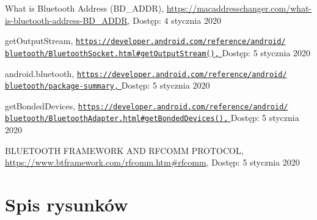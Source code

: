 \documentclass[a4paper,12pt, twoside]{article}
\begin{document}
\begin{thebibliography}{}
    		What is Bluetooth Address (BD\_ADDR),
    		\newline\url{https://macaddresschanger.com/what-is-bluetooth-address-BD_ADDR}, 
    		\newline Dostęp: 4 stycznia 2020
    		
    		getOutputStream,
    		\newline\href{https://developer.android.com/reference/android/bluetooth/BluetoothSocket.html\#getOutputStream()}
    		 {\nolinkurl{https://developer.android.com/reference/android/}
                 \\
                  \nolinkurl{bluetooth/BluetoothSocket.html\#getOutputStream(),}
                 }
    		\newline Dostęp: 5 stycznia 2020
    		
    		android.bluetooth,
    		\newline\href{https://developer.android.com/reference/android/bluetooth/}
    		 {\nolinkurl{https://developer.android.com/reference/android/}
                 \\
                  \nolinkurl{bluetooth/package-summary,}
                 }
    		\newline Dostęp: 5 stycznia 2020
    		
    		getBondedDevices,
    		\newline\href{https://developer.android.com/reference/android/bluetooth/BluetoothAdapter.html\#getBondedDevices()}
    		 {\nolinkurl{https://developer.android.com/reference/android/}
                 \\
                  \nolinkurl{bluetooth/BluetoothAdapter.html\#getBondedDevices(),}
                 }
    		\newline Dostęp: 5 stycznia 2020
    		
    		BLUETOOTH FRAMEWORK AND RFCOMM PROTOCOL,
    		\newline\url{https://www.btframework.com/rfcomm.htm#rfcomm}, 
    		\newline Dostęp: 5 stycznia 2020
    		
    	\end{thebibliography}
    	\endgroup
    	
    	\newpage
    	\section{Spis rysunków}
    	\begingroup
    	\renewcommand{\section}[2]{}%
    	\listoffigures
    	\endgroup
    	
    	\newpage
    	\section{Spis algorytmów}
    	\begingroup
    	\renewcommand{\section}[2]{}%
    	\lstlistoflistings
    	\renewcommand{\section}[2]{}%
    	\endgroup
    	
    
\end{document}
